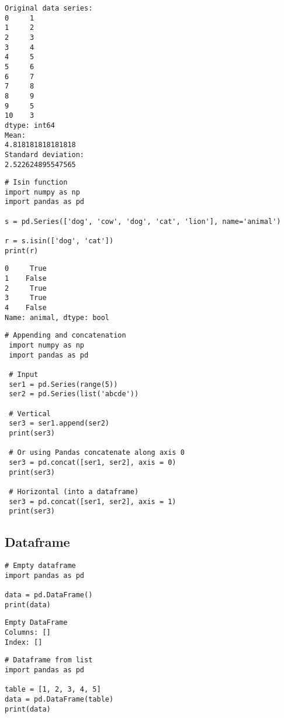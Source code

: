 \documentclass[11pt]{article}
\begin{document}
\begin{verbatim}
Original data series:
0     1
1     2
2     3
3     4
4     5
5     6
6     7
7     8
8     9
9     5
10    3
dtype: int64
Mean:
4.818181818181818
Standard deviation:
2.522624895547565
\end{verbatim}

\begin{verbatim}
# Isin function
import numpy as np
import pandas as pd

s = pd.Series(['dog', 'cow', 'dog', 'cat', 'lion'], name='animal')

r = s.isin(['dog', 'cat'])
print(r)
\end{verbatim}

\begin{verbatim}
0     True
1    False
2     True
3     True
4    False
Name: animal, dtype: bool
\end{verbatim}


\begin{verbatim}
# Appending and concatenation
 import numpy as np
 import pandas as pd

 # Input
 ser1 = pd.Series(range(5))
 ser2 = pd.Series(list('abcde'))

 # Vertical
 ser3 = ser1.append(ser2)
 print(ser3)

 # Or using Pandas concatenate along axis 0
 ser3 = pd.concat([ser1, ser2], axis = 0)
 print(ser3)

 # Horizontal (into a dataframe)
 ser3 = pd.concat([ser1, ser2], axis = 1)
 print(ser3)
\end{verbatim}

\subsection{Dataframe}
\label{sec:orgfe78b37}

\begin{verbatim}
# Empty dataframe
import pandas as pd

data = pd.DataFrame()
print(data)
\end{verbatim}

\begin{verbatim}
Empty DataFrame
Columns: []
Index: []
\end{verbatim}


\begin{verbatim}
# Dataframe from list
import pandas as pd

table = [1, 2, 3, 4, 5]
data = pd.DataFrame(table)
print(data)
\end{verbatim}
\end{document}
